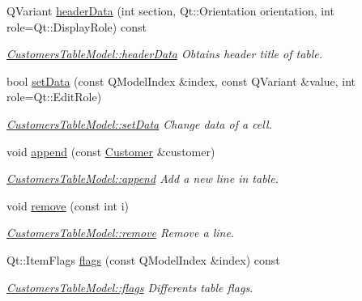 \begin{DoxyCompactItemize}
Q\+Variant \hyperlink{classGui_1_1Widgets_1_1WdgModels_1_1CustomersTableModel_ac68af68b991afa792798f7b72c5c7664}{header\+Data} (int section, Qt\+::\+Orientation orientation, int role=Qt\+::\+Display\+Role) const 
\begin{DoxyCompactList}\small\item\em \hyperlink{classGui_1_1Widgets_1_1WdgModels_1_1CustomersTableModel_ac68af68b991afa792798f7b72c5c7664}{Customers\+Table\+Model\+::header\+Data} Obtains header title of table. \end{DoxyCompactList}\item 
bool \hyperlink{classGui_1_1Widgets_1_1WdgModels_1_1CustomersTableModel_a7045685ee906328da54e25205314175c}{set\+Data} (const Q\+Model\+Index \&index, const Q\+Variant \&value, int role=Qt\+::\+Edit\+Role)
\begin{DoxyCompactList}\small\item\em \hyperlink{classGui_1_1Widgets_1_1WdgModels_1_1CustomersTableModel_a7045685ee906328da54e25205314175c}{Customers\+Table\+Model\+::set\+Data} Change data of a cell. \end{DoxyCompactList}\item 
void \hyperlink{classGui_1_1Widgets_1_1WdgModels_1_1CustomersTableModel_a823210160956ca5045dff8e796c5abec}{append} (const \hyperlink{classModels_1_1Customer}{Customer} \&customer)
\begin{DoxyCompactList}\small\item\em \hyperlink{classGui_1_1Widgets_1_1WdgModels_1_1CustomersTableModel_a823210160956ca5045dff8e796c5abec}{Customers\+Table\+Model\+::append} Add a new line in table. \end{DoxyCompactList}\item 
void \hyperlink{classGui_1_1Widgets_1_1WdgModels_1_1CustomersTableModel_aa70b783d09916574eeaabfdb5ccc5240}{remove} (const int i)
\begin{DoxyCompactList}\small\item\em \hyperlink{classGui_1_1Widgets_1_1WdgModels_1_1CustomersTableModel_aa70b783d09916574eeaabfdb5ccc5240}{Customers\+Table\+Model\+::remove} Remove a line. \end{DoxyCompactList}\item 
Qt\+::\+Item\+Flags \hyperlink{classGui_1_1Widgets_1_1WdgModels_1_1CustomersTableModel_a49e82b87cf13a746f4fd1ff1c6252037}{flags} (const Q\+Model\+Index \&index) const 
\begin{DoxyCompactList}\small\item\em \hyperlink{classGui_1_1Widgets_1_1WdgModels_1_1CustomersTableModel_a49e82b87cf13a746f4fd1ff1c6252037}{Customers\+Table\+Model\+::flags} Differents table flags. \end{DoxyCompactList}\item 

\end{DoxyCompactItemize}
